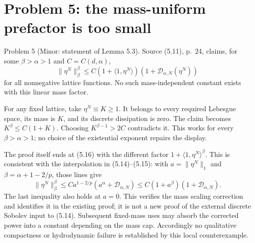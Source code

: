 \documentclass[10pt]{article}
\begin{document}
\section*{Problem 5: the mass-uniform prefactor is too small}
Problem 5 (Minor: statement of Lemma 5.3).  Source (5.11), p. 24, claims, for some \(\beta>\alpha>1\) and \(C=C(d,\alpha)\), \[\|\eta^N\|_\beta^\beta
 \le C(1+\langle1,\eta^N\rangle)(1+\mathcal D_{\alpha,N}(\eta^N))\] for all nonnegative lattice functions. No such mass-independent constant exists with this linear mass factor.\par
For any fixed lattice, take \(\eta^N\equiv K\ge1\). It belongs to every required Lebesgue space, its mass is \(K\), and its discrete dissipation is zero. The claim becomes \(K^\beta\le C(1+K)\). Choosing \(K^{\beta-1}>2C\) contradicts it. This works for every \(\beta>\alpha>1\); no choice of the existential exponent repairs the display.\par
The proof itself ends at (5.16) with the different factor \(1+\langle1,\eta^N\rangle^\beta\). This is consistent with the interpolation in (5.14)–(5.15): with \(a=\|\eta^N\|_1\) and \(\beta=\alpha+1-2/p\), those lines give \[\|\eta^N\|_\beta^\beta
 \le C a^{1-2/p}(a^\alpha+\mathcal D_{\alpha,N})
 \le C(1+a^\beta)(1+\mathcal D_{\alpha,N}).\] The last inequality also holds at \(a=0\). This verifies the mass scaling correction and identifies it in the existing proof; it is not a new proof of the external discrete Sobolev input to (5.14). Subsequent fixed-mass uses may absorb the corrected power into a constant depending on the mass cap. Accordingly no qualitative compactness or hydrodynamic failure is established by this local counterexample.\par
\end{document}
